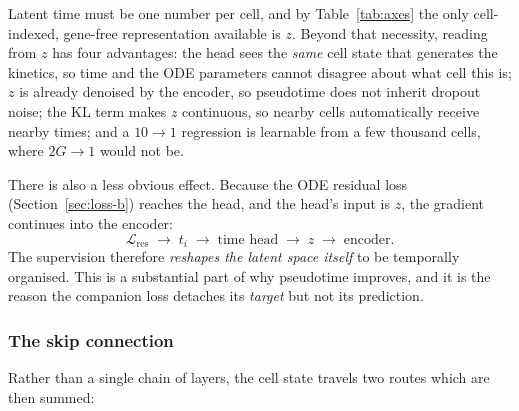 \documentclass[11pt,a4paper]{article}
\theoremstyle{definition}
\begin{document}
Latent time must be one number per cell, and by Table~\ref{tab:axes} the only
cell-indexed, gene-free representation available is $z$. Beyond that necessity,
reading from $z$ has four advantages: the head sees the \emph{same} cell state
that generates the kinetics, so time and the ODE parameters cannot disagree
about what cell this is; $z$ is already denoised by the encoder, so pseudotime
does not inherit dropout noise; the KL term makes $z$ continuous, so nearby
cells automatically receive nearby times; and a $10 \to 1$ regression is
learnable from a few thousand cells, where $2G \to 1$ would not be.

There is also a less obvious effect. Because the ODE residual loss
(Section~\ref{sec:loss-b}) reaches the head, and the head's input is $z$, the
gradient continues into the encoder:
%
\begin{equation}
\mathcal{L}_{\text{res}} \;\to\; t_i \;\to\; \text{time head} \;\to\; z \;\to\; \text{encoder}.
\end{equation}
%
The supervision therefore \emph{reshapes the latent space itself} to be
temporally organised. This is a substantial part of why pseudotime improves,
and it is the reason the companion loss detaches its \emph{target} but not its
prediction.

\subsubsection{The skip connection}
\label{sec:skip}

Rather than a single chain of layers, the cell state travels two routes which
are then summed:
\end{document}
